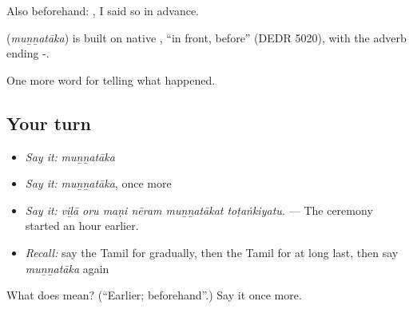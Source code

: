 Also beforehand:  , I said so in advance.

\begin{cousinweb}
\textbf{} (\emph{muṉṉatāka}) is built on native , \textquotedblleft{}in front, before\textquotedblright{} (DEDR 5020), with the adverb ending -.
\end{cousinweb}

\begin{grammarlens}[title={What you've built}]
One more word for telling what happened.
\end{grammarlens}

\subsection*{Your turn}
\begin{itemize}
\raggedright
  \item \emph{Say it:} \emph{muṉṉatāka}
  \item \emph{Say it:} \emph{muṉṉatāka}, once more
  \item \emph{Say it:} \emph{viḻā oru maṇi nēram muṉṉatākat toṭaṅkiyatu.} — The ceremony started an hour earlier.
  \item \emph{Recall:} say the Tamil for gradually, then the Tamil for at long last, then say \emph{muṉṉatāka} again
\end{itemize}

\begin{tcolorbox}[breakable,colback=teal!4,colframe=teal!35!black,title={Before you move on}]
What does  mean? (\textquotedblleft{}Earlier; beforehand\textquotedblright{}.) Say it once more.
\end{tcolorbox}
